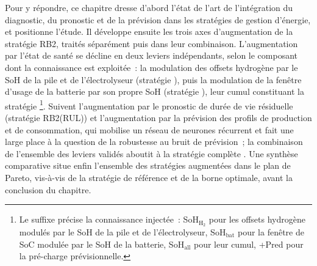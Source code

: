 Pour y répondre, ce chapitre dresse d'abord l'état de l'art de l'intégration du diagnostic, du pronostic et de la prévision dans les stratégies de gestion d'énergie, et positionne l'étude. Il développe ensuite les trois axes d'augmentation de la stratégie RB2, traités séparément puis dans leur combinaison. L'augmentation par l'état de santé se décline en deux leviers indépendants, selon le composant dont la connaissance est exploitée~: la modulation des offsets hydrogène par le SoH de la pile et de l'électrolyseur (stratégie \RBsohH), puis la modulation de la fenêtre d'usage de la batterie par son propre SoH (stratégie \RBsohB), leur cumul constituant la stratégie \RBsohA{}\footnote{Le suffixe précise la connaissance injectée~: SoH$_{\mathrm{H_2}}$ pour les offsets hydrogène modulés par le SoH de la pile et de l'électrolyseur, SoH$_{\mathrm{bat}}$ pour la fenêtre de SoC modulée par le SoH de la batterie, SoH$_{\mathrm{all}}$ pour leur cumul, +Pred pour la pré-charge prévisionnelle.}. Suivent l'augmentation par le pronostic de durée de vie résiduelle (stratégie RB2(RUL)) et l'augmentation par la prévision des profils de production et de consommation, qui mobilise un réseau de neurones récurrent et fait une large place à la question de la robustesse au bruit de prévision~; la combinaison de l'ensemble des leviers validés aboutit à la stratégie complète \RBult. Une synthèse comparative situe enfin l'ensemble des stratégies augmentées dans le plan de Pareto, vis-à-vis de la stratégie de référence et de la borne optimale, avant la conclusion du chapitre.


\newpage
